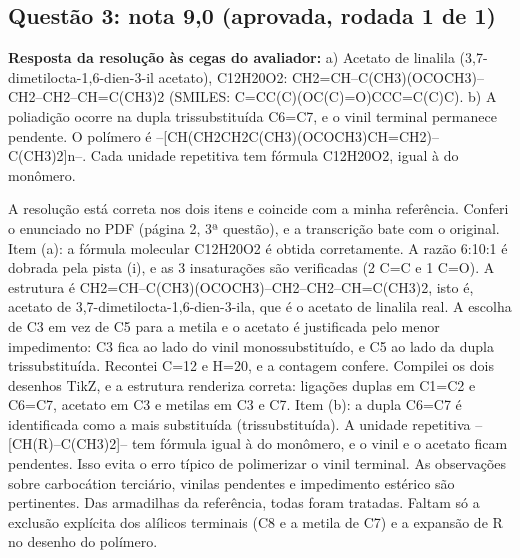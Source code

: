 \documentclass{article}%
\begin{document}
\subsection*{Questão 3: nota 9,0 (aprovada, rodada 1 de 1)}%
\textbf{Resposta da resolução às cegas do avaliador:} a) Acetato de linalila (3,7{-}dimetilocta{-}1,6{-}dien{-}3{-}il acetato), C12H20O2: CH2=CH--C(CH3)(OCOCH3)--CH2--CH2--CH=C(CH3)2 (SMILES: C=CC(C)(OC(C)=O)CCC=C(C)C).\newline%
\newline%
b) A poliadição ocorre na dupla trissubstituída C6=C7, e o vinil terminal permanece pendente. O polímero é --{[}CH(CH2CH2C(CH3)(OCOCH3)CH=CH2)--C(CH3)2{]}n--. Cada unidade repetitiva tem fórmula C12H20O2, igual à do monômero.\par %
A resolução está correta nos dois itens e coincide com a minha referência.\newline%
\newline%
Conferi o enunciado no PDF (página 2, 3ª questão), e a transcrição bate com o original.\newline%
\newline%
Item (a): a fórmula molecular C12H20O2 é obtida corretamente. A razão 6:10:1 é dobrada pela pista (i), e as 3 insaturações são verificadas (2 C=C e 1 C=O). A estrutura é CH2=CH--C(CH3)(OCOCH3)--CH2--CH2--CH=C(CH3)2, isto é, acetato de 3,7{-}dimetilocta{-}1,6{-}dien{-}3{-}ila, que é o acetato de linalila real. A escolha de C3 em vez de C5 para a metila e o acetato é justificada pelo menor impedimento: C3 fica ao lado do vinil monossubstituído, e C5 ao lado da dupla trissubstituída. Recontei C=12 e H=20, e a contagem confere. Compilei os dois desenhos TikZ, e a estrutura renderiza correta: ligações duplas em C1=C2 e C6=C7, acetato em C3 e metilas em C3 e C7.\newline%
\newline%
Item (b): a dupla C6=C7 é identificada como a mais substituída (trissubstituída). A unidade repetitiva --{[}CH(R)--C(CH3)2{]}-- tem fórmula igual à do monômero, e o vinil e o acetato ficam pendentes. Isso evita o erro típico de polimerizar o vinil terminal. As observações sobre carbocátion terciário, vinilas pendentes e impedimento estérico são pertinentes.\newline%
\newline%
Das armadilhas da referência, todas foram tratadas. Faltam só a exclusão explícita dos alílicos terminais (C8 e a metila de C7) e a expansão de R no desenho do polímero.\newline%
\end{document}

